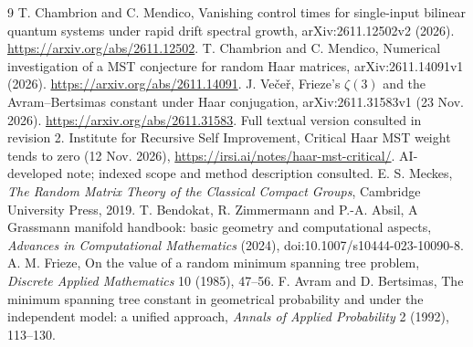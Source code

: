 \documentclass[11pt]{article}
\begin{document}
\begin{thebibliography}{9}
 T. Chambrion and C. Mendico, Vanishing control times for single-input bilinear quantum systems under rapid drift spectral growth, arXiv:2611.12502v2 (2026). \url{https://arxiv.org/abs/2611.12502}.
 T. Chambrion and C. Mendico, Numerical investigation of a MST conjecture for random Haar matrices, arXiv:2611.14091v1 (2026). \url{https://arxiv.org/abs/2611.14091}.
 J. Ve\v{c}e\v{r}, Frieze's $\zeta(3)$ and the Avram--Bertsimas constant under Haar conjugation, arXiv:2611.31583v1 (23 Nov. 2026). \url{https://arxiv.org/abs/2611.31583}. Full textual version consulted in revision 2.
 Institute for Recursive Self Improvement, Critical Haar MST weight tends to zero (12 Nov. 2026), \url{https://irsi.ai/notes/haar-mst-critical/}. AI-developed note; indexed scope and method description consulted.
 E. S. Meckes, \emph{The Random Matrix Theory of the Classical Compact Groups}, Cambridge University Press, 2019.
 T. Bendokat, R. Zimmermann and P.-A. Absil, A Grassmann manifold handbook: basic geometry and computational aspects, \emph{Advances in Computational Mathematics} (2024), doi:10.1007/s10444-023-10090-8.
 A. M. Frieze, On the value of a random minimum spanning tree problem, \emph{Discrete Applied Mathematics} 10 (1985), 47--56.
 F. Avram and D. Bertsimas, The minimum spanning tree constant in geometrical probability and under the independent model: a unified approach, \emph{Annals of Applied Probability} 2 (1992), 113--130.
\end{thebibliography}
\end{document}
